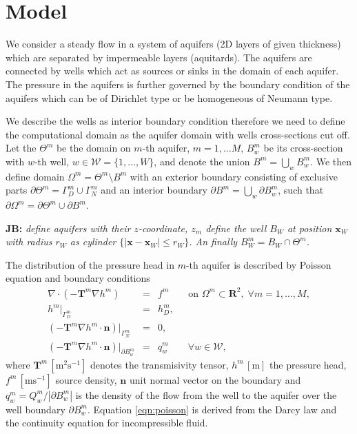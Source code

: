 \documentclass[preprint,12pt]{elsarticle}
\def\vc#1{\mathbf{\boldsymbol{#1}}}     %
\def\abs#1{\left|#1\right|}
\def\abs#1{| #1 |}
\newcommand{\R}{\mathbf{R}}
\newcommand{\noteJB}[1]{{\color{Blue} \textbf{JB: } \textit{#1}}}
\begin{document}
\section{Model}
\label{sec:model}
We consider a steady flow in a system of aquifers (2D layers of given thickness) which are separated by 
impermeable layers (aquitards). The aquifers are connected by wells which act as sources
or sinks in the domain of each aquifer. The pressure in the aquifers is further governed by the boundary 
condition of the aquifers which can be of Dirichlet type or be homogeneous of Neumann type.

We describe the wells as interior boundary condition therefore we need to define the computational domain
as the aquifer domain with wells cross-sections cut off. Let the $\Theta^m$ be the domain on $m$-th aquifer,
$m=1,\ldots M$, $B^m_w$ be its cross-section with $w$-th well, $w\in\mathcal{W}=\{1,\ldots,W\}$, and denote
the union $B^m=\bigcup\limits_{w}B^m_w$. 
We then define domain $\Omega^m = \Theta^m\setminus B^m$ with an exterior boundary 
consisting of exclusive parts $\partial\Theta^m=\Gamma^m_D\cup\Gamma^m_N$ and an interior boundary 
$\partial B^m=\bigcup\limits_{w}\partial B^m_w$, such that $\partial\Omega^m=\partial\Theta^m\cup\partial B^m$.

\noteJB{define aquifers with their $z$-coordinate, $z_m$
define the well $B_W$ at position $\vc x_W$ with radius $r_W$ as cylinder $\{\abs{\vc x - \vc x_W} \le r_W\}$.
An finally $B_W^m = B_W \cap \Theta^m$.}


The distribution of the pressure head in $m$-th aquifer is described by Poisson equation and 
boundary conditions
\begin{eqnarray} \label{eqn:poisson}
\nabla\cdot(-\mathbf{T}^m\nabla h^m) &=& f^m \qquad \textrm{on } \Omega^m\subset\R^2,\; \forall m=1,\dots,M, \\
h^m|_{\Gamma^m_D} &=& h^m_D, \\
\left(-\mathbf{T}^m\nabla h^m\cdot\vc{n}\right)|_{\Gamma^m_N} &=& 0, \\
\left(-\mathbf{T}^m\nabla h^m\cdot\vc{n}\right)|_{\partial B^m_w} &=& q^m_w \qquad \forall w\in\mathcal{W},
\end{eqnarray}
where $\mathbf{T}^m\, [\textrm{m}^2\textrm{s}^{-1}]$ denotes the transmisivity tensor,
$h^m\, [\textrm{m}]$ the pressure head, $f^m\, [\textrm{m}\textrm{s}^{-1}]$ source density,
$\vc{n}$ unit normal vector on the boundary and
$q^m_w = Q^m_w/|\partial B^m_w|$ is the density of the flow from the well to the aquifer over the well boundary 
$\partial B^m_w$. Equation \eqref{eqn:poisson} is derived from the Darcy law and the continuity equation 
for incompressible fluid.
\end{document}
